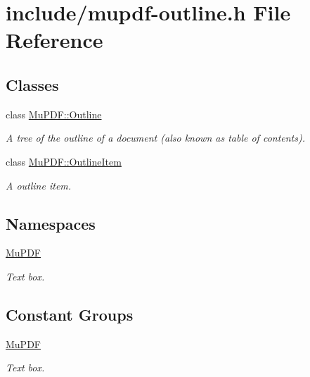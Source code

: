 \hypertarget{mupdf-outline_8h}{\section{include/mupdf-\/outline.h File Reference}
\label{mupdf-outline_8h}
}
\subsection*{Classes}
\begin{DoxyCompactItemize}
\item 
class \hyperlink{class_mu_p_d_f_1_1_outline}{Mu\-P\-D\-F\-::\-Outline}
\begin{DoxyCompactList}\small\item\em A tree of the outline of a document (also known as table of contents). \end{DoxyCompactList}\item 
class \hyperlink{class_mu_p_d_f_1_1_outline_item}{Mu\-P\-D\-F\-::\-Outline\-Item}
\begin{DoxyCompactList}\small\item\em A outline item. \end{DoxyCompactList}\end{DoxyCompactItemize}
\subsection*{Namespaces}
\begin{DoxyCompactItemize}
\item 
\hyperlink{namespace_mu_p_d_f}{Mu\-P\-D\-F}
\begin{DoxyCompactList}\small\item\em Text box. \end{DoxyCompactList}\end{DoxyCompactItemize}
\subsection*{Constant Groups}
\begin{DoxyCompactItemize}
\item 
\hyperlink{namespace_mu_p_d_f}{Mu\-P\-D\-F}
\begin{DoxyCompactList}\small\item\em Text box. \end{DoxyCompactList}\end{DoxyCompactItemize}
